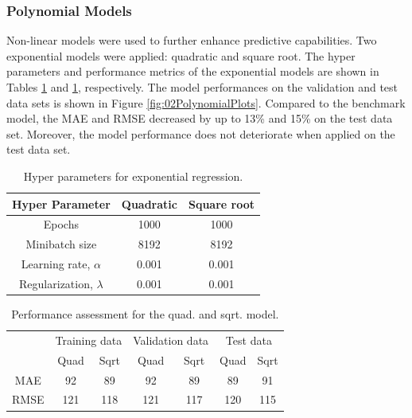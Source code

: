 \subsubsection{Polynomial Models}
Non-linear models were used to further enhance predictive capabilities.  Two exponential models were applied: quadratic and square root.  The hyper parameters and performance metrics of the exponential models are shown in Tables \ref{tab:02ExponentialHP} and \ref{tab:02ExponentialHP}, respectively. The model performances on the validation and test data sets is shown in Figure \ref{fig:02PolynomialPlots}. Compared to the benchmark model, the MAE and RMSE decreased by up to 13\% and 15\% on the test data set. Moreover, the model performance does not deteriorate when applied on the test data set. 

\begin{table}[h]
    \centering
    {
    \begin{tabular}{ c | c | c}
        Hyper Parameter                  &  Quadratic   & Square root       \\
        \hline
        Epochs                           &  1000    & 1000  \\
        Minibatch size                   &  8192    & 8192    \\
        Learning rate, $\alpha$          &  0.001   & 0.001  \\
        Regularization, $\lambda$          &  0.001 & 0.001 \\
    \end{tabular}}
    \caption{Hyper parameters for exponential regression.}
    \label{tab:02ExponentialHP}
\end{table}

\begin{table}[h]
    \centering
    {
    \begin{tabular}{c|c|c|c|c|c|c|}
      & \multicolumn{2}{c|}{Training data} & \multicolumn{2}{c|}{Validation data} & \multicolumn{2}{c|}{Test data} \\ \cline{2-7} 
      & Quad             & Sqrt            & \multicolumn{1}{c|}{Quad}   & Sqrt   & Quad           & Sqrt          \\ \hline
    MAE   & 92               & 89              & 92                          & 89     & 89             & 91            \\
    RMSE  & 121              & 118             & \multicolumn{1}{c|}{121}    & 117    & 120            & 115           \\
    \end{tabular}}
    \caption{Performance assessment for the quad. and sqrt. model.}
    \label{tab:02ExponentialPE}
\end{table}

